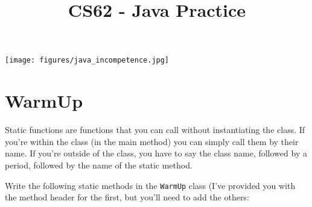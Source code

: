 \documentclass[11pt]{article}
\title{CS62 - Java Practice}
\author{}
\date{}
\begin{document}
\maketitle

\vspace{-.75in}

\begin{center}
\texttt{[image: figures/java\_incompetence.jpg]}

\end{center}
\vspace{-0.1in}

\section{WarmUp}

Static functions are functions that you can call without instantiating the class.  If you're within the class (in the main method) you can simply call them by their name.  If you're outside of the class, you have to say the class name, followed by a period, followed by the name of the static method.

Write the following static methods in the \texttt{WarmUp} class (I've provided you with the method header for the first, but you'll need to add the others:
\end{document}
